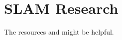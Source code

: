\documentclass[a4paper,12pt]{article}
\begin{document}
\section{SLAM Research}
The resources \citep{a1678144} and \citep{a938381} might be helpful.


\end{document}
